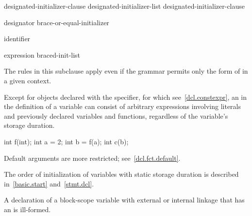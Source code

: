 \begin{bnf}
\br
    designated-initializer-clause\br
    designated-initializer-list \terminal{,} designated-initializer-clause
\end{bnf}

\begin{bnf}
\br
    designator brace-or-equal-initializer
\end{bnf}

\begin{bnf}
\br
     identifier
\end{bnf}

\begin{bnf}
\br
    expression\br
    braced-init-list
\end{bnf}

\begin{note}
The rules in this subclause apply even if the grammar permits only
the  form
of  in a given context.
\end{note}

\pnum
Except for objects declared with the  specifier, for which see~\ref{dcl.constexpr},
an  in the definition of a variable can consist of
arbitrary expressions involving literals and previously declared
variables and functions,
regardless of the variable's storage duration.
\begin{example}
\begin{codeblock}
int f(int);
int a = 2;
int b = f(a);
int c(b);
\end{codeblock}
\end{example}

\pnum
\begin{note}
Default arguments are more restricted; see~\ref{dcl.fct.default}.
\end{note}

\pnum
\begin{note}
The order of initialization of variables with static storage duration is described in~\ref{basic.start}
and~\ref{stmt.dcl}.
\end{note}

\pnum
A declaration of a block-scope variable with external or internal
linkage that has an  is ill-formed.

